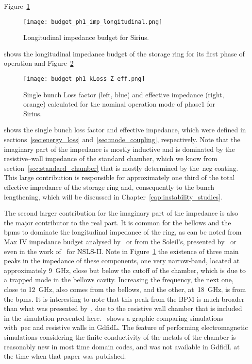     Figure~\ref{fig:long_imp_budget}
    \begin{figure}
        \centering
        \texttt{[image: budget\_ph1\_imp\_longitudinal.png]}
        \caption{Longitudinal impedance budget for Sirius.}
        \label{fig:long_imp_budget}
    \end{figure}
    shows the longitudinal impedance budget of the storage ring for its first phase of operation and Figure~\ref{fig:ph1_kLoss_Z_eff}
    \begin{figure}
        \centering
        \texttt{[image: budget\_ph1\_kLoss\_Z\_eff.png]}
        \caption{Single bunch Loss factor (left, blue) and effective impedance (right, orange) calculated for the nominal operation mode of phase1 for Sirius.}
        \label{fig:ph1_kLoss_Z_eff}
    \end{figure}
    shows the single bunch loss factor and effective impedance, which were defined in sections~\ref{sec:energy_loss} and~\ref{sec:mode_coupling}, respectively. Note that the imaginary part of the impedance is mostly inductive and is dominated by the resistive--wall impedance of the standard chamber, which we know from section~\ref{sec:standard_chamber} that is mostly determined by the~\gls{neg} coating. This large contribution is responsible for approximately one third of the total effective impedance of the storage ring and, consequently to the bunch lengthening, which will be discussed in Chapter~\ref{cap:instability_studies}.

    The second larger contribution for the imaginary part of the impedance is also the major contributor to the real part. It is common for the bellows and the \glspl{bpm} to dominate the longitudinal impedance of the ring, as can be noted from Max IV impedance budget analysed by~ or from the Soleil's, presented by~ or even in the work of~ for NSLS-II. Note in Figure~\ref{fig:long_imp_budget} the existence of three main peaks in the impedance of these components, one very narrow-band, located at approximately \SI{9}{\giga\hertz}, close but below the cutoff of the chamber,  which is due to a trapped mode in the bellows cavity. Increasing the frequency, the next one, close to \SI{12}{\giga\hertz}, also comes from the bellows, and the other, at~\SI{18}{\giga\hertz}, is from the \glspl{bpm}.
    It is interesting to note that this peak from the BPM is much broader than what was presented by~, due to the resistive wall chamber that is included in the simulation presented here.~ shows a graphic comparing simulations with~\gls{pec} and resistive walls in GdfidL. The feature of performing electromagnetic simulations considering the finite conductivity of the metals of the chamber is reasonably new in most time domain codes, and was not available in GdfidL at the time when that paper was published.

